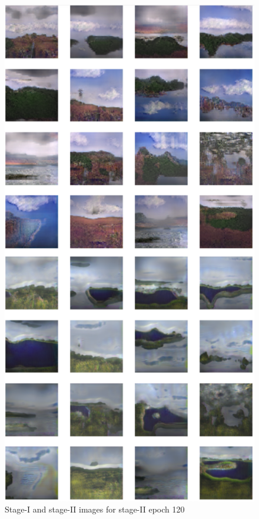 \documentclass{article}
\begin{document}
	
	\begin{figure}[h]
	\centering
	\includegraphics[scale=0.6]{images/epoch120_FID433.png}
	\caption{Stage-I and stage-II images for stage-II epoch 120}
	\end{figure}
\end{document}
